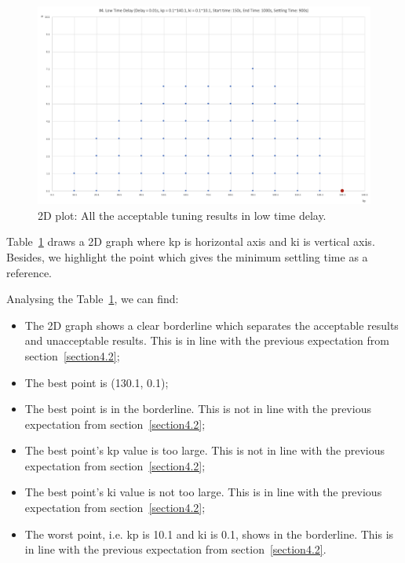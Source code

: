 \begin{figure}[htbp]
\centering
\includegraphics[width = .819\textwidth]{figure/4_4_1_2d.png}
\caption{2D plot: All the acceptable tuning results in low time delay.}
\label{4_4_1_2d}
\end{figure}

Table~\ref{4_4_1_2d} draws a 2D graph where kp is horizontal axis and ki is vertical axis. Besides, we highlight the point which gives the minimum settling time as a reference. 

Analysing the Table~\ref{4_4_1_2d}, we can find: 

\begin{itemize}
\item The 2D graph shows a clear borderline which separates the acceptable results and unacceptable results. This is in line with the previous expectation from section~\ref{section4.2}; 

\item The best point is (130.1, 0.1); 

\item The best point is in the borderline.  This is not in line with the previous expectation from section~\ref{section4.2}; 

\item The best point’s kp value is too large. This is not in line with the previous expectation from section~\ref{section4.2}; 

\item The best point's ki value is not too large.  This is in line with the previous expectation from section~\ref{section4.2}; 

\item The worst point, i.e. kp is 10.1 and ki is 0.1, shows in the borderline. This is in line with the previous expectation from section~\ref{section4.2}. 
\end{itemize}

